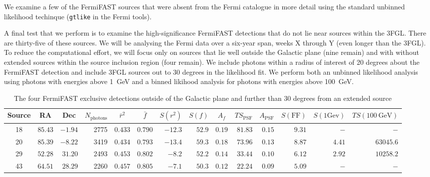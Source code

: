 \documentclass[useAMS,usenatbib]{mn2e}
\begin{document}
We examine a few of the FermiFAST sources that were absent from the
Fermi catalogue in more detail using the standard unbinned likelihood
techinque ({\tt gtlike} in the Fermi tools).

A final test that we perform is to examine the high-significance
FermiFAST detections that do not lie near sources within the 3FGL.
There are thirty-five of these sources.  We will be analysing the
Fermi data over a six-year span, weeks X through Y (even longer than
the 3FGL).  To reduce the computational effort, we will focus only on
sources that lie well outside the Galactic plane (nine remain) and
with without extended sources within the source inclusion region (four
remain).  We include photons within a radius of interest of 20 degrees
about the FermiFAST detection and include 3FGL sources out to 30
degrees in the likelihood fit.  We perform both an unbinned likelihood
analysis using photons with energies above 1~GeV and a binned likihood
analysis for photons with energies above 100~GeV.

\begin{table}
  \caption{The four FermiFAST exclusive detections outside of the
    Galactic plane and further than 30 degrees from an extended
    source}
  \label{tab:fermisig}
\begin{tabular}{crrrrrrrrrrrrr}
    \hline
    Source & \multicolumn{1}{c}{RA} & \multicolumn{1}{c}{Dec}  & \multicolumn{1}{c}{$N_\mathrm{photons}$}  &\multicolumn{1}{c}{$\bar r^2$} & \multicolumn{1}{c}{$\bar f$} & \multicolumn{1}{c}{$S(r^2)$} & \multicolumn{1}{c}{$S(f)$} & \multicolumn{1}{c}{$A_f$} & \multicolumn{1}{c}{$TS_\mathrm{PSF}$} & \multicolumn{1}{c}{$A_\mathrm{PSF}$} & \multicolumn{1}{c}{$S(\mathrm{FF})$} & \multicolumn{1}{c}{$S(\mathrm{1Gev})$}  & \multicolumn{1}{c}{$TS(\mathrm{100~GeV})$} 
 \\
    \hline
   18  & $ 85.43$ & $ -1.94$ &   2775 & $0.433$ & $0.790$ & $ -12.3$ & $  52.9$ & $0.19$ & $    81.83$ & $0.15$ & $     9.31$ & $-$    & $-$\\ 
   20  & $ 85.39$ & $ -8.22$ &   3419 & $0.434$ & $0.793$ & $ -13.4$ & $  59.3$ & $0.18$ & $    73.96$ & $0.13$ & $     8.87$ & $4.41$ & $63045.6$ \\ 
   29  & $ 52.28$ & $ 31.20$ &   2493 & $0.453$ & $0.802$ & $  -8.2$ & $  52.2$ & $0.14$ & $    33.44$ & $0.10$ & $     6.12$ & $2.92$ & $10258.2$ \\ 
   43  & $ 64.51$ & $ 28.29$ &   2260 & $0.457$ & $0.805$ & $  -7.1$ & $  50.3$ & $0.12$ & $    22.24$ & $0.09$ & $     5.09$ & $-$    & $-$ \\ 
\end{tabular}
\end{table}
\end{document}
